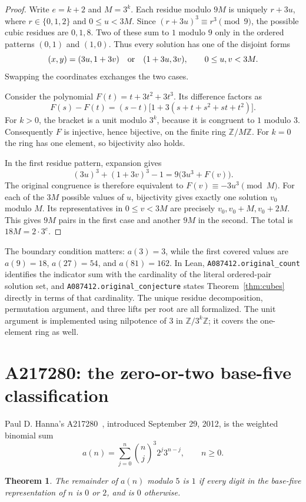 \documentclass[11pt]{article}
\newtheorem{theorem}{Theorem}[section]
\newcommand{\Z}{\mathbb Z}
\begin{document}
\begin{proof}
Write $e=k+2$ and $M=3^k$. Each residue modulo $9M$ is uniquely $r+3u$,
where $r\in\{0,1,2\}$ and $0\le u<3M$. Since
$(r+3u)^3\equiv r^3\pmod9$, the possible cubic residues are $0,1,8$.
Two of these sum to $1$ modulo $9$ only in the ordered patterns $(0,1)$
and $(1,0)$. Thus every solution has one of the disjoint forms
\[
 (x,y)=(3u,1+3v)\quad\hbox{or}\quad(1+3u,3v),
 \qquad 0\le u,v<3M.
\]
Swapping the coordinates exchanges the two cases.

Consider the polynomial $F(t)=t+3t^2+3t^3$. Its difference factors as
\[
 F(s)-F(t)=(s-t)\bigl[1+3(s+t+s^2+st+t^2)\bigr].
\]
For $k>0$, the bracket is a unit modulo $3^k$, because it is congruent to
$1$ modulo $3$. Consequently $F$ is injective, hence bijective, on the
finite ring $\Z/M\Z$. For $k=0$ the ring has one element, so bijectivity
also holds.

In the first residue pattern, expansion gives
\[
 (3u)^3+(1+3v)^3-1=9\bigl(3u^3+F(v)\bigr).
\]
The original congruence is therefore equivalent to
$F(v)\equiv-3u^3\pmod M$. For each of the $3M$ possible values of $u$,
bijectivity gives exactly one solution $v_0$ modulo $M$. Its representatives
in $0\le v<3M$ are precisely $v_0,v_0+M,v_0+2M$. This gives $9M$ pairs
in the first case and another $9M$ in the second. The total is
$18M=2\cdot3^e$.
\end{proof}

The boundary condition matters: $a(3)=3$, while the first covered values
are $a(9)=18$, $a(27)=54$, and $a(81)=162$. In Lean,
\texttt{A087412.original\_count} identifies the indicator sum with the
cardinality of the literal ordered-pair solution set, and
\texttt{A087412.original\_conjecture} states Theorem~\ref{thm:cubes}
directly in terms of that cardinality. The unique residue decomposition,
permutation argument, and three lifts per root are all formalized.
The unit argument is implemented using nilpotence of $3$ in
$\Z/3^k\Z$; it covers the one-element ring as well.

\section{A217280: the zero-or-two base-five classification}

Paul D. Hanna's A217280~\cite{A217280}, introduced September 29, 2012,
is the weighted binomial sum
\[
 a(n)=\sum_{j=0}^{n}\binom nj^3 2^j3^{n-j},\qquad n\ge0.
\]

\begin{theorem}\label{thm:digits}
The remainder of $a(n)$ modulo $5$ is $1$ if every digit in the base-five
representation of $n$ is $0$ or $2$, and is $0$ otherwise.
\end{theorem}
\end{document}
